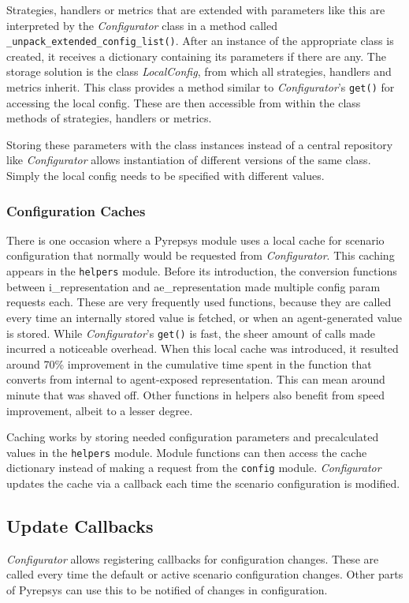 \documentclass[%
    ]{\PathToTumTemplate/thesis/tum_thesis}
\begin{document}
Strategies, handlers or metrics that are extended with parameters like this are interpreted by the \emph{Configurator} class in a method called \lstinline{_unpack_extended_config_list()}.
After an instance of the appropriate class is created, it receives a dictionary containing its parameters if there are any.
The storage solution is the class \emph{LocalConfig}, from which all strategies, handlers and metrics inherit.
This class provides a method similar to \emph{Configurator}'s \lstinline{get()} for accessing the local config.
These are then accessible from within the class methods of strategies, handlers or metrics.

Storing these parameters with the class instances instead of a central repository like \emph{Configurator} allows instantiation of different versions of the same class.
Simply the local config needs to be specified with different values.

\subsubsection{Configuration Caches}
There is one occasion where a Pyrepsys module uses a local cache for scenario configuration that normally would be requested from \emph{Configurator}.
This caching appears in the \texttt{helpers} module.
Before its introduction, the conversion functions between \gls{i_representation} and \gls{ae_representation} made multiple config param requests each.
These are very frequently used functions, because they are called every time an internally stored value is fetched, or when an agent-generated value is stored.
While \emph{Configurator}'s \lstinline{get()} is fast, the sheer amount of calls made incurred a noticeable overhead.
When this local cache was introduced, it resulted around 70\% improvement in the cumulative time spent in the function that converts from internal to agent-exposed representation.
This can mean around minute that was shaved off. 
Other functions in helpers also benefit from speed improvement, albeit to a lesser degree.

Caching works by storing needed configuration parameters and precalculated values in the \texttt{helpers} module.
Module functions can then access the cache dictionary instead of making a request from the \texttt{config} module.
\emph{Configurator} updates the cache via a callback each time the scenario configuration is modified.


\subsection{Update Callbacks}\label{sec:config_update_callbacks}
\emph{Configurator} allows registering callbacks for configuration changes.
These are called every time the default or active scenario configuration changes.
Other parts of Pyrepsys can use this to be notified of changes in configuration.
\end{document}
